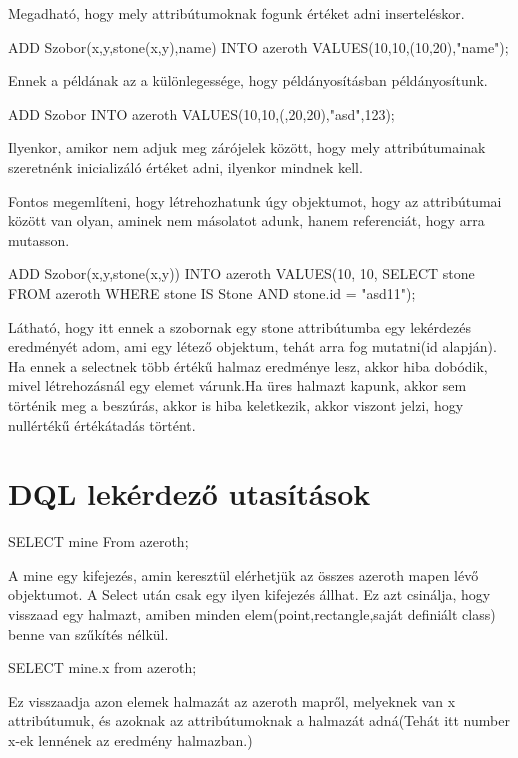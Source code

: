 \begin{sql}
Megadható, hogy mely attribútumoknak fogunk értéket adni inserteléskor.
\begin{sql}
ADD Szobor(x,y,stone(x,y),name) INTO azeroth VALUES(10,10,(10,20),"name");
\end{sql}
Ennek a példának az a különlegessége, hogy példányosításban példányosítunk.

\begin{sql}
ADD Szobor INTO azeroth VALUES(10,10,(,20,20),"asd",123);
\end{sql}
Ilyenkor, amikor nem adjuk meg zárójelek között, hogy mely attribútumainak szeretnénk inicializáló értéket adni, ilyenkor mindnek kell.

Fontos megemlíteni, hogy létrehozhatunk úgy objektumot, hogy az attribútumai között van olyan, aminek nem másolatot adunk, hanem referenciát, hogy arra mutasson.
\begin{sql}
ADD Szobor(x,y,stone(x,y)) INTO azeroth VALUES(10, 10, SELECT stone FROM azeroth WHERE stone IS Stone AND stone.id = "asd11");
\end{sql}
Látható, hogy itt ennek a szobornak egy stone attribútumba egy lekérdezés eredményét adom, ami egy létező objektum, tehát arra fog mutatni(id alapján).
Ha ennek a selectnek több értékű halmaz eredménye lesz, akkor hiba dobódik, mivel létrehozásnál egy elemet várunk.Ha üres halmazt kapunk, akkor sem történik meg a beszúrás, akkor is hiba keletkezik, akkor viszont jelzi, hogy nullértékű értékátadás történt.

\section{DQL lekérdező utasítások}

\begin{sql}
SELECT mine From azeroth;
\end{sql}
A mine egy kifejezés, amin keresztül elérhetjük az összes  azeroth mapen lévő objektumot. A Select után csak egy ilyen kifejezés állhat. Ez azt csinálja, hogy visszaad egy halmazt, amiben minden elem(point,rectangle,saját definiált class) benne van szűkítés nélkül.
\begin{sql}
SELECT mine.x from azeroth;
\end{sql}
Ez visszaadja azon elemek halmazát az azeroth mapről, melyeknek van x attribútumuk, és azoknak az attribútumoknak a halmazát adná(Tehát itt number x-ek lennének az eredmény halmazban.)



\end{sql}
